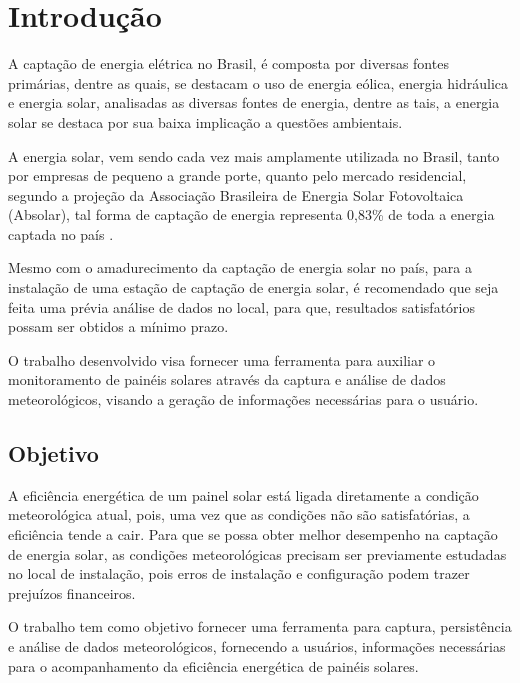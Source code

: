 \nocite{ddd_eric_evans}
\nocite{gof_patterns}
\nocite{sonda_project}
\nocite{nosql_distilled}
\nocite{js_async}

\chapter{Introdução}

A captação de energia elétrica no Brasil, é composta por diversas fontes primárias, dentre as quais, se destacam o uso de energia eólica, energia hidráulica e energia solar, analisadas as diversas fontes de energia, dentre as tais, a energia solar se destaca por sua baixa implicação a questões ambientais.

A energia solar, vem sendo cada vez mais amplamente utilizada no Brasil, tanto por empresas de pequeno a grande porte, quanto pelo mercado residencial, segundo a projeção da Associação Brasileira de Energia Solar Fotovoltaica (Absolar), tal forma de captação de energia representa 0,83\% de toda a energia captada no país \cite{maturidade_absolar}.

Mesmo com o amadurecimento da captação de energia solar no país, para a instalação de uma estação de captação de energia solar, é recomendado que seja feita uma prévia análise de dados no local, para que, resultados satisfatórios possam ser obtidos a mínimo prazo.

O trabalho desenvolvido visa fornecer uma ferramenta para auxiliar o monitoramento de painéis solares através da captura e análise de dados meteorológicos, visando a geração de informações necessárias para o usuário.

\section{Objetivo}

A eficiência energética de um painel solar está ligada diretamente a condição meteorológica atual, pois, uma vez que as condições não são satisfatórias, a eficiência tende a cair.
Para que se possa obter melhor desempenho na captação de energia solar, as condições meteorológicas precisam ser previamente estudadas no local de instalação, pois erros de instalação e configuração podem trazer prejuízos financeiros.

O trabalho tem como objetivo fornecer uma ferramenta para captura, persistência e análise de dados meteorológicos, fornecendo a usuários, informações necessárias para o acompanhamento da eficiência energética de painéis solares.

